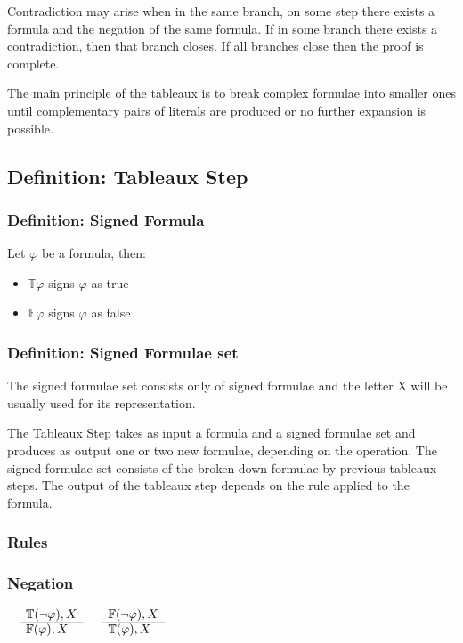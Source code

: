 \documentclass{article}
\begin{document}
	Contradiction may arise when in the same branch, on some step there exists a formula and the negation of the same formula.
	If in some branch there exists a contradiction, then that branch closes. If all branches close then the proof is complete.
	
	The main principle of the tableaux is to break complex formulae into smaller ones until complementary pairs of literals are
	produced or no further expansion is possible.

	\subsection{Definition: Tableaux Step}

		\subsubsection*{Definition: Signed Formula} 
			Let $\varphi$ be a formula, then:
			\begin{itemize}
				\item $\mathbb{T}\varphi$ signs $\varphi$ as true
				\item $\mathbb{F}\varphi$ signs $\varphi$ as false
			\end{itemize}

		\subsubsection*{Definition: Signed Formulae set}
			The signed formulae set consists only of signed formulae and the letter X will be usually used for its representation.

		The Tableaux Step takes as input a formula and a signed formulae set and produces as 
		output one or two new formulae, depending on the operation.
		The signed formulae set consists of the broken down formulae by previous tableaux steps.
		The output of the tableaux step depends on the rule applied to the formula.

		\subsubsection{Rules}
		\subsubsection*{Negation}
			$\begin{array}{rl}
				& \mathbb{T}(\neg \varphi), X \\
			      \cline{2-2}
			      & \mathbb{F}(\varphi), X
			\end{array}$
			\:\:\:\:\:\:\:\:\:\:\:\:\:\:\:\:\:\:\:\:\:\:\:\:\:\:\:\:\:\:\:\:\:\:\:\:\:\:\:\:\:\:\:\:\:\:\:\:
			$\begin{array}{rl}
				& \mathbb{F}(\neg \varphi), X \\
			      \cline{2-2}
			      & \mathbb{T}(\varphi), X
			\end{array}$
\end{document}
